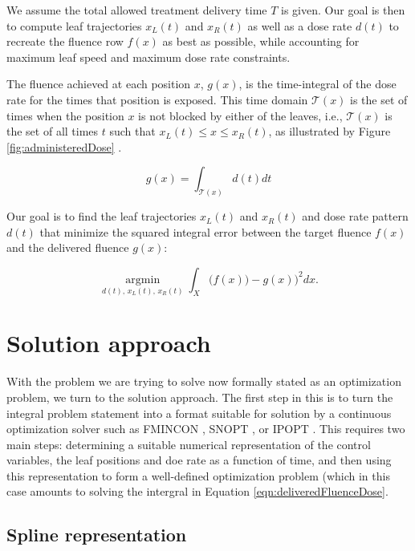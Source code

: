\documentclass[12pt]{article}
\begin{document}
We assume the total allowed treatment delivery time $T$ is given. Our goal is then to compute leaf trajectories $x_L(t)$ and $x_R(t)$ as well as a dose rate $d(t)$ to recreate the fluence row $f(x)$ as best as possible, while accounting for maximum leaf speed and maximum dose rate constraints.

The fluence achieved at each position $x$, $g(x)$, is the time-integral of the dose rate for the times that position is exposed.
This time domain $\mathcal{T}(x)$ is the set of times when the position $x$ is not blocked by either of the leaves, i.e.,
$\mathcal{T}(x)$ is the set of all times $t$ such that $x_L(t) \le x \leq x_R(t)$,
as illustrated by Figure \ref{fig:administeredDose} .

\begin{equation}
g(x) = \int_{\mathcal{T}(x)} d(t) dt
\label{eqn:deliveredFluenceDose}
\end{equation}

Our goal is to find the leaf trajectories $x_L(t)$ and $x_R(t)$ and dose rate pattern $d(t)$
that minimize the squared integral error between the target fluence $f(x)$ and the delivered fluence $g(x)$:

\begin{equation}
\underset{d(t), \, x_L(t), \, x_R(t)}{\operatorname{argmin}}
\int_X \bigg(f(x)) - g(x)\bigg)^2 dx .
\label{eqn:fluenceMapOptimization}
\end{equation}




\section{Solution approach}

With the problem we are trying to solve now formally stated as an optimization problem, we turn
to the solution approach. The first step in this is to turn the integral problem statement into
a format suitable for solution by a continuous optimization solver such as
FMINCON \cite{MatlabOptimizationToolbox2014}, SNOPT \cite{Snopt7}, or IPOPT \cite{Wachter2006}.
This requires two main steps: determining a suitable numerical representation of the control variables, the leaf positions and doe rate as a function of time, and then using this representation
to form a well-defined optimization problem (which in this case amounts to solving the intergral
in Equation \ref{eqn:deliveredFluenceDose}.

\subsection{Spline representation}
\end{document}
